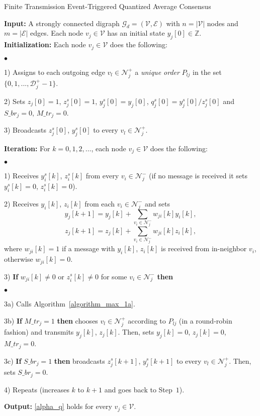 \documentclass[twocolumn]{autart}    %
\newenvironment{varalgorithm}[1]
  {\algorithm\renewcommand{\thealgorithm}{#1}}
  {\endalgorithm}
\newenvironment{list4}{
	\begin{list}{$\bullet$}{%
			\setlength{\itemsep}{0.05cm}
			\setlength{\labelsep}{0.2cm}
			\setlength{\labelwidth}{0.3cm}
			\setlength{\parsep}{0in} 
			\setlength{\parskip}{0in}
			\setlength{\topsep}{0in} 
			\setlength{\partopsep}{0in}
			\setlength{\leftmargin}{0.16in}}}
	{\end{list}}
\let\mathbb=\mathds %
\begin{document}
\noindent
\vspace{-0.5cm}    
\begin{varalgorithm}{1}
\caption{Finite Transmission Event-Triggered Quantized Average Consensus}
\textbf{Input:} A strongly connected digraph $\mathcal{G}_d = (\mathcal{V}, \mathcal{E})$ with $n=|\mathcal{V}|$ nodes and $m=|\mathcal{E}|$ edges. Each node $v_j\in \mathcal{V}$ has an initial state $y_j[0] \in \mathbb{Z}$. 
\\
\textbf{Initialization:} Each node $v_j \in \mathcal{V}$ does the following: 
\begin{list4}
\item[1)] Assigns to each outgoing edge $v_l \in \mathcal{N}^+_j$ a \textit{unique order} $P_{lj}$ in the set $\{0,1,..., \mathcal{D}_j^+ -1\}$.
\item[2)] Sets $z_j[0] = 1$, $z^s_j[0] = 1$, $y^s_j[0] = y_j[0]$, $q^s_j[0] = y^s_j[0] / z^s_j[0]$ and $S\_br_j = 0$, $M\_tr_j = 0$. 
\item[3)] Broadcasts $z^s_j[0]$, $y^s_j[0]$ to every $v_l \in \mathcal{N}_j^+$.
\end{list4}
\textbf{Iteration:} For $k=0,1,2,\dots$, each node $v_j \in \mathcal{V}$ does the following: 
\begin{list4}
\item[1)] Receives $y^s_i[k]$, $z^s_i[k]$ from every $v_i \in \mathcal{N}_j^-$ (if no message is received it sets $y^s_i[k] = 0$, $z^s_i[k] = 0$). 
\item[2)] Receives $y_i[k]$, $z_i[k]$ from each $v_i \in \mathcal{N}_j^-$ and sets 
$$
y_j[k+1] = y_j[k] + \sum_{v_i \in \mathcal{N}_j^-} w_{ji}[k]y_i[k] ,
$$  \vspace{-.3cm}
$$
z_j[k+1] = z_j[k] + \sum_{v_i \in \mathcal{N}_j^-} w_{ji}[k]z_i[k] ,
$$
where $w_{ji}[k]=1$ if a message with $y_i[k]$, $z_i[k]$ is received from in-neighbor $v_i$, otherwise $w_{ji}[k]=0$. 
\item[3)] \textbf{If} $w_{ji}[k] \neq 0$ or $z^s_i[k] \neq 0$ for some $v_i \in \mathcal{N}_j^-$ \textbf{then}
\begin{list4}
\item[3a)] Calls Algorithm~\ref{algorithm_max_1a}. 
\item[3b)] \textbf{If} $M\_tr_j = 1$ \textbf{then} chooses $v_l \in \mathcal{N}_j^+$ according to $P_{lj}$ (in a round-robin fashion) and transmits $y_j[k]$, $z_j[k]$. 
Then, sets $y_j[k] = 0$, $z_j[k] = 0$, $M\_tr_j = 0$. 
\item[3c)] \textbf{If} $S\_br_j = 1$ \textbf{then} broadcasts $z^s_j[k+1]$, $y^s_j[k+1]$ to every $v_l \in \mathcal{N}_j^+$. 
Then, sets $S\_br_j = 0$. 
\end{list4}
\item[4)] Repeats (increases $k$ to $k + 1$ and goes back to Step~$1$).
\end{list4}
\textbf{Output:} \eqref{alpha_q} holds for every $v_j \in \mathcal{V}$. 
\label{algorithm_max}
\end{varalgorithm}
\end{document}
